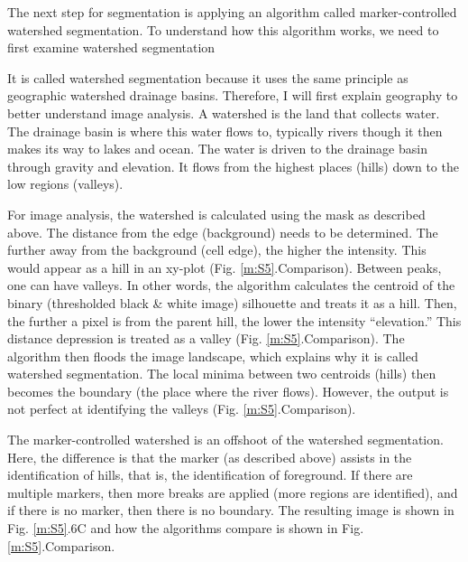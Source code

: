 The next step for segmentation is applying an algorithm called marker-controlled watershed segmentation. To understand how this algorithm works, we need to first examine watershed segmentation

It is called watershed segmentation because it uses the same principle as geographic watershed drainage basins. Therefore, I will first explain geography to better understand image analysis. A watershed is the land that collects water. The drainage basin is where this water flows to, typically rivers though it then makes its way to lakes and ocean. The water is driven to the drainage basin through gravity and elevation. It flows from the highest places (hills) down to the low regions (valleys).

For image analysis, the watershed is calculated using the mask as described above. The distance from the edge (background) needs to be determined. The further away from the background (cell edge), the higher the intensity. This would appear as a hill in an xy-plot (Fig. \ref{m:S5}.Comparison). Between peaks, one can have valleys. In other words, the algorithm calculates the centroid of the binary (thresholded black \& white image) silhouette and treats it as a hill. Then, the further a pixel is from the parent hill, the lower the intensity “elevation.” This distance depression is treated as a valley (Fig. \ref{m:S5}.Comparison). The algorithm then floods the image landscape, which explains why it is called watershed segmentation. The local minima between two centroids (hills) then becomes the boundary (the place where the river flows). However, the output is not perfect at identifying the valleys (Fig. \ref{m:S5}.Comparison).

The marker-controlled watershed is an offshoot of the watershed segmentation. Here, the difference is that the marker (as described above) assists in the identification of hills, that is, the identification of foreground. If there are multiple markers, then more breaks are applied (more regions are identified), and if there is no marker, then there is no boundary. The resulting image is shown in Fig. \ref{m:S5}.6C and how the algorithms compare is shown in Fig. \ref{m:S5}.Comparison.



